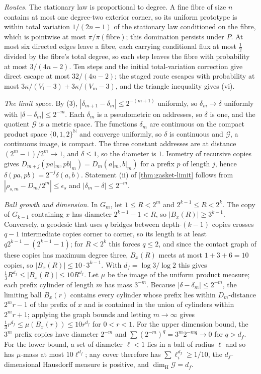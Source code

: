 \documentclass[11pt]{article}
\newcommand{\N}{\mathbb{N}}
\newcommand{\dH}{\dim_{\mathrm{H}}}
\begin{document}
\emph{Routes.}
The stationary law is proportional to degree.
A fine fibre of size $n$ contains at most one degree-two exterior corner, so its uniform prototype is within total variation $1/(2n-1)$ of the stationary law conditioned on the fibre, which is pointwise at most $\pi/\pi(\text{fibre})$; this domination persists under $P$.
At most six directed edges leave a fibre, each carrying conditional flux at most $\tfrac12$ divided by the fibre's total degree, so each step leaves the fibre with probability at most $3/(4n-2)$.
Ten steps and the initial total-variation correction give direct escape at most $32/(4n-2)$; the staged route escapes with probability at most $3\kappa/(V_{\mathrm f}-3)+3\kappa/(V_{\mathrm m}-3)$, and the triangle inequality gives (vi).

\emph{The limit space.}
By (3), $|\delta_{m+1}-\delta_m|\le2^{-(m+1)}$ uniformly, so $\delta_m\to\delta$ uniformly with $|\delta-\delta_m|\le2^{-m}$.
Each $\delta_m$ is a pseudometric on addresses, so $\delta$ is one, and the quotient $\mathcal G$ is a metric space.
The functions $\delta_m$ are continuous on the compact product space $\{0,1,2\}^{\N}$ and converge uniformly, so $\delta$ is continuous and $\mathcal G$, a continuous image, is compact.
The three constant addresses are at distance $(2^m-1)/2^m\to1$, and $\delta\le1$, so the diameter is $1$.
Isometry of recursive copies gives $D_{m+j}(pa|_m,pb|_m)=D_m(a|_m,b|_m)$ for a prefix $p$ of length $j$, hence $\delta(pa,pb)=2^{-j}\delta(a,b)$.
Statement (ii) of \cref{thm:gasket-limit} follows from $|\rho_{s,m}-D_m/2^m|\le\epsilon_s$ and $|\delta_m-\delta|\le2^{-m}$.

\emph{Ball growth and dimension.}
In $G_m$, let $1\le R<2^m$ and $2^{k-1}\le R<2^k$.
The copy of $G_{k-1}$ containing $x$ has diameter $2^{k-1}-1<R$, so $|B_x(R)|\ge3^{k-1}$.
Conversely, a geodesic that uses $q$ bridges between depth-$(k-1)$ copies crosses $q-1$ intermediate copies corner to corner, so its length is at least $q2^{k-1}-(2^{k-1}-1)$; for $R<2^k$ this forces $q\le2$, and since the contact graph of these copies has maximum degree three, $B_x(R)$ meets at most $1+3+6=10$ copies, so $|B_x(R)|\le10\cdot3^{k-1}$.
With $d_f=\log3/\log2$ this gives $\tfrac13R^{d_f}\le|B_x(R)|\le10R^{d_f}$.
Let $\mu$ be the image of the uniform product measure; each prefix cylinder of length $m$ has mass $3^{-m}$.
Because $|\delta-\delta_m|\le2^{-m}$, the limiting ball $B_x(r)$ contains every cylinder whose prefix lies within $D_m$-distance $2^m r-1$ of the prefix of $x$ and is contained in the union of cylinders within $2^m r+1$; applying the graph bounds and letting $m\to\infty$ gives $\tfrac13r^{d_f}\le\mu(B_x(r))\le10r^{d_f}$ for $0<r<1$.
For the upper dimension bound, the $3^m$ prefix copies have diameter $2^{-m}$ and $\sum(2^{-m})^q=3^m2^{-mq}\to0$ for $q>d_f$.
For the lower bound, a set of diameter $\ell<1$ lies in a ball of radius $\ell$ and so has $\mu$-mass at most $10\ell^{d_f}$; any cover therefore has $\sum\ell_i^{d_f}\ge1/10$, the $d_f$-dimensional Hausdorff measure is positive, and $\dH\mathcal G=d_f$.
\end{document}

